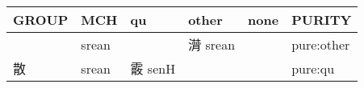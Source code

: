 \documentclass[14pt,a4paper]{scrartcl}
\begin{document}
\begin{longtable}[c]{@{}llllll@{}}
\toprule
\begin{minipage}[b]{0.14\columnwidth}\raggedright\strut
GROUP
\strut\end{minipage} &
\begin{minipage}[b]{0.14\columnwidth}\raggedright\strut
MCH
\strut\end{minipage} &
\begin{minipage}[b]{0.14\columnwidth}\raggedright\strut
qu
\strut\end{minipage} &
\begin{minipage}[b]{0.14\columnwidth}\raggedright\strut
other
\strut\end{minipage} &
\begin{minipage}[b]{0.14\columnwidth}\raggedright\strut
none
\strut\end{minipage} &
\begin{minipage}[b]{0.14\columnwidth}\raggedright\strut
PURITY
\strut\end{minipage}\tabularnewline
\midrule
\endhead
\begin{minipage}[t]{0.14\columnwidth}\raggedright\strut
𢿱
\strut\end{minipage} &
\begin{minipage}[t]{0.14\columnwidth}\raggedright\strut
srean
\strut\end{minipage} &
\begin{minipage}[t]{0.14\columnwidth}\raggedright\strut
\strut\end{minipage} &
\begin{minipage}[t]{0.14\columnwidth}\raggedright\strut
潸 srean
\strut\end{minipage} &
\begin{minipage}[t]{0.14\columnwidth}\raggedright\strut
\strut\end{minipage} &
\begin{minipage}[t]{0.14\columnwidth}\raggedright\strut
pure:other
\strut\end{minipage}\tabularnewline
\begin{minipage}[t]{0.14\columnwidth}\raggedright\strut
散
\strut\end{minipage} &
\begin{minipage}[t]{0.14\columnwidth}\raggedright\strut
srean
\strut\end{minipage} &
\begin{minipage}[t]{0.14\columnwidth}\raggedright\strut
霰 senH
\strut\end{minipage} &
\begin{minipage}[t]{0.14\columnwidth}\raggedright\strut
\strut\end{minipage} &
\begin{minipage}[t]{0.14\columnwidth}\raggedright\strut
\strut\end{minipage} &
\begin{minipage}[t]{0.14\columnwidth}\raggedright\strut
pure:qu
\strut\end{minipage}\tabularnewline
\bottomrule
\end{longtable}
\end{document}
